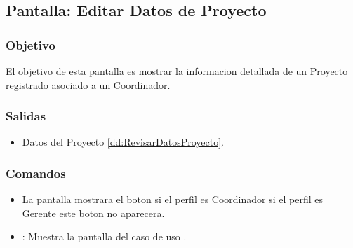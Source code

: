 \subsection{Pantalla: Editar Datos de Proyecto}

\subsubsection{Objetivo}
El objetivo de esta pantalla es mostrar la informacion detallada de un Proyecto registrado asociado a un Coordinador.


\subsubsection{Salidas}
\begin{itemize}
 \item Datos del Proyecto \ref{dd:RevisarDatosProyecto}.
\end{itemize}

\subsubsection{Comandos}
\begin{itemize}
 \item La pantalla mostrara el boton  si el perfil es Coordinador si el perfil es Gerente este boton no aparecera.
 \item {}: Muestra la pantalla  del caso de uso .
\end{itemize}